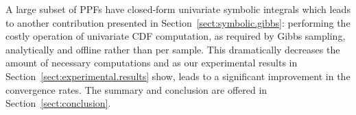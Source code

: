 A large subset of PPFs have closed-form univariate symbolic integrals which leads to another contribution
presented in Section~\ref{sect:symbolic.gibbs}: %
performing 
the costly operation of univariate CDF computation, as required by Gibbs sampling, analytically and offline rather than per sample.     
This dramatically decreases the amount of necessary computations and as our experimental results in Section~\ref{sect:experimental.results} show, 
leads to a significant improvement in the convergence rates. 
The summary and conclusion are offered in Section~\ref{sect:conclusion}. 

